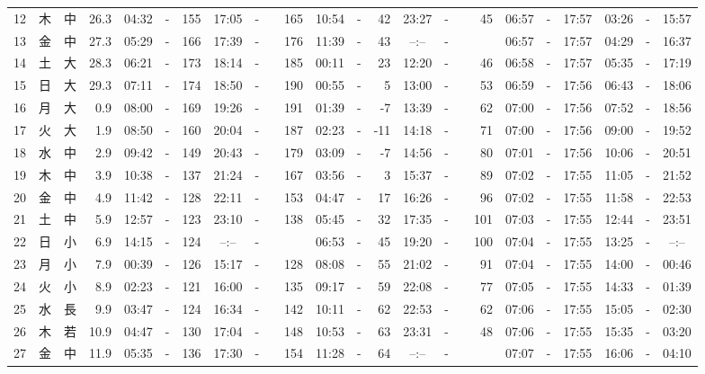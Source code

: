 \documentclass[12pt,a4j]{jsarticle}
\begin{document}
\begin{table}[htbp]
\begin{center}
{\begin{tabular}{|rc|cr|ccrccr|ccrccr|ccc|ccc|}
12 & 木 & 中 & 26.3 &  04:32 &-& 155 &  17:05 &-& 165 &  10:54 &-&  42 &  23:27 &-&  45 & 06:57 & -& 17:57 & 03:26 & -& 15:57 \\
13 & 金 & 中 & 27.3 &  05:29 &-& 166 &  17:39 &-& 176 &  11:39 &-&  43 &  --:-- &-&~~~~~ & 06:57 & -& 17:57 & 04:29 & -& 16:37 \\
14 & 土 & 大 & 28.3 &  06:21 &-& 173 &  18:14 &-& 185 &  00:11 &-&  23 &  12:20 &-&  46 & 06:58 & -& 17:57 & 05:35 & -& 17:19 \\
15 & 日 & 大 & 29.3 &  07:11 &-& 174 &  18:50 &-& 190 &  00:55 &-&   5 &  13:00 &-&  53 & 06:59 & -& 17:56 & 06:43 & -& 18:06 \\
16 & 月 & 大 &  0.9 &  08:00 &-& 169 &  19:26 &-& 191 &  01:39 &-&  -7 &  13:39 &-&  62 & 07:00 & -& 17:56 & 07:52 & -& 18:56 \\
17 & 火 & 大 &  1.9 &  08:50 &-& 160 &  20:04 &-& 187 &  02:23 &-& -11 &  14:18 &-&  71 & 07:00 & -& 17:56 & 09:00 & -& 19:52 \\
18 & 水 & 中 &  2.9 &  09:42 &-& 149 &  20:43 &-& 179 &  03:09 &-&  -7 &  14:56 &-&  80 & 07:01 & -& 17:56 & 10:06 & -& 20:51 \\
19 & 木 & 中 &  3.9 &  10:38 &-& 137 &  21:24 &-& 167 &  03:56 &-&   3 &  15:37 &-&  89 & 07:02 & -& 17:55 & 11:05 & -& 21:52 \\
20 & 金 & 中 &  4.9 &  11:42 &-& 128 &  22:11 &-& 153 &  04:47 &-&  17 &  16:26 &-&  96 & 07:02 & -& 17:55 & 11:58 & -& 22:53 \\
21 & 土 & 中 &  5.9 &  12:57 &-& 123 &  23:10 &-& 138 &  05:45 &-&  32 &  17:35 &-& 101 & 07:03 & -& 17:55 & 12:44 & -& 23:51 \\
22 & 日 & 小 &  6.9 &  14:15 &-& 124 &  --:-- &-&~~~~~ &  06:53 &-&  45 &  19:20 &-& 100 & 07:04 & -& 17:55 & 13:25 & -& --:-- \\
23 & 月 & 小 &  7.9 &  00:39 &-& 126 &  15:17 &-& 128 &  08:08 &-&  55 &  21:02 &-&  91 & 07:04 & -& 17:55 & 14:00 & -& 00:46 \\
24 & 火 & 小 &  8.9 &  02:23 &-& 121 &  16:00 &-& 135 &  09:17 &-&  59 &  22:08 &-&  77 & 07:05 & -& 17:55 & 14:33 & -& 01:39 \\
25 & 水 & 長 &  9.9 &  03:47 &-& 124 &  16:34 &-& 142 &  10:11 &-&  62 &  22:53 &-&  62 & 07:06 & -& 17:55 & 15:05 & -& 02:30 \\
26 & 木 & 若 & 10.9 &  04:47 &-& 130 &  17:04 &-& 148 &  10:53 &-&  63 &  23:31 &-&  48 & 07:06 & -& 17:55 & 15:35 & -& 03:20 \\
27 & 金 & 中 & 11.9 &  05:35 &-& 136 &  17:30 &-& 154 &  11:28 &-&  64 &  --:-- &-&~~~~~ & 07:07 & -& 17:55 & 16:06 & -& 04:10 \\

\end{tabular}}
\end{center}
\end{table}
\end{document}
